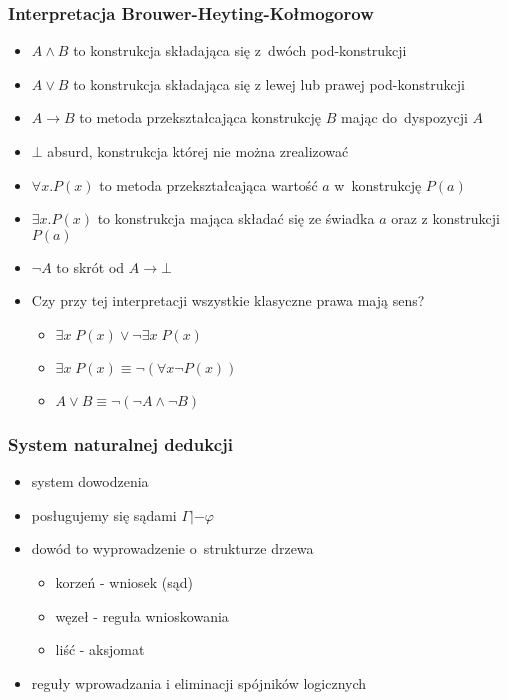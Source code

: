 \documentclass{beamer}
\begin{document}
\begin{frame}
\frametitle{Interpretacja Brouwer-Heyting-Kołmogorow}

\begin{itemize}
 \item $A \wedge B$ to konstrukcja składająca się z~dwóch pod-konstrukcji
 \item $A \vee B$ to konstrukcja składająca się z lewej lub prawej pod-konstrukcji
 \item $A \to B$ to metoda przekształcająca konstrukcję $B$ mając do~dyspozycji $A$
 \item $\bot$ absurd, konstrukcja której nie można zrealizować
 \item $\forall x. P(x)$ to metoda przekształcająca wartość $a$ w~konstrukcję $P(a)$
 \item $\exists x. P(x)$ to konstrukcja mająca składać się ze świadka $a$ oraz z konstrukcji $P(a)$
 \item $\neg A$ to skrót od $A \to \bot$ 
 \item Czy przy tej interpretacji wszystkie klasyczne prawa mają sens?
\begin{itemize}
\item $\exists x\;P(x) \vee \neg \exists x\;P(x)$
\item $\exists x\;P(x) \equiv \neg (\forall x \neg P(x))$
\item $A \vee B \equiv \neg (\neg A \wedge \neg B)$
\end{itemize}

\end{itemize}


\end{frame}


\begin{frame}
\frametitle{System naturalnej dedukcji}

\begin{itemize}
 \item system dowodzenia
 \item posługujemy się sądami $\Gamma |- \varphi$
 \item dowód to wyprowadzenie o~strukturze drzewa
 \begin{itemize}
 \item korzeń - wniosek (sąd)
 \item węzeł - reguła wnioskowania
 \item liść - aksjomat
 \end{itemize}
 \item reguły wprowadzania i eliminacji spójników logicznych
\end{itemize}


\end{frame}
\end{document}
